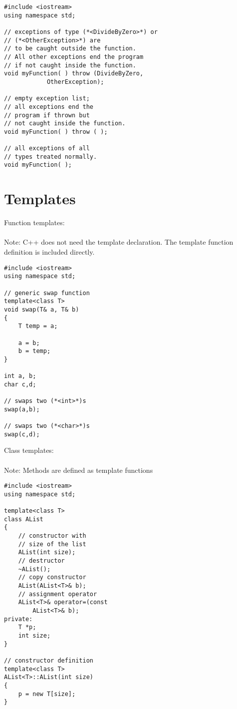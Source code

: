 \documentclass[10pt]{article}
\begin{document}
\begin{multicols*}{3}
\lstset {language=C++}
\begin{lstlisting}
#include <iostream>
using namespace std;

// exceptions of type (*<DivideByZero>*) or 
// (*<OtherException>*) are
// to be caught outside the function.
// All other exceptions end the program
// if not caught inside the function.
void myFunction( ) throw (DivideByZero,
            OtherException);

// empty exception list; 
// all exceptions end the
// program if thrown but
// not caught inside the function.
void myFunction( ) throw ( );

// all exceptions of all
// types treated normally.
void myFunction( );
\end{lstlisting}
%
%
\section*{Templates}
\small
Function templates:\\ \\
Note: C++ does not need 
the template declaration.
The template function
definition is included directly.
\lstset {language=C++}
\begin{lstlisting}
#include <iostream>
using namespace std;

// generic swap function
template<class T>
void swap(T& a, T& b)
{
    T temp = a;
    
    a = b;
    b = temp;
}

int a, b;
char c,d;

// swaps two (*<int>*)s
swap(a,b);

// swaps two (*<char>*)s
swap(c,d);
\end{lstlisting}
Class templates:\\ \\
Note: Methods are defined as 
template functions

\lstset {language=C++}
\begin{lstlisting}
#include <iostream>
using namespace std;

template<class T>
class AList
{
    // constructor with 
    // size of the list
    AList(int size);
    // destructor
    ~AList();
    // copy constructor
    AList(AList<T>& b);
    // assignment operator
    AList<T>& operator=(const
        AList<T>& b);
private:
    T *p;
    int size;
}

// constructor definition
template<class T>
AList<T>::AList(int size)
{
    p = new T[size];
}


\end{lstlisting}
\end{multicols*}
\end{document}
